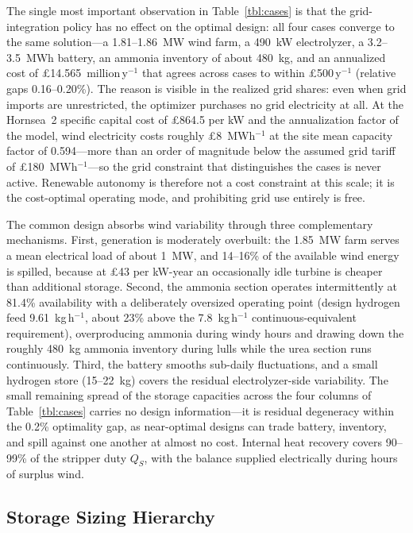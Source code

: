 \documentclass[letterpaper]{article}
\begin{document}
The single most important observation in Table~\ref{tbl:cases} is
that the grid-integration policy has no effect on the optimal
design: all four cases converge to the same solution---a
1.81--1.86~MW wind farm, a 490~kW electrolyzer, a 3.2--3.5~MWh
battery, an ammonia inventory of about 480~kg, and an annualized
cost of \pounds 14.565~million\,y$^{-1}$ that agrees across cases to
within \pounds 500\,y$^{-1}$ (relative gaps 0.16--0.20\%). The
reason is visible in the realized grid shares: even when grid
imports are unrestricted, the optimizer purchases no grid
electricity at all. At the Hornsea~2 specific capital cost of
\pounds 864.5 per kW and the annualization factor of the model, wind
electricity costs roughly \pounds 8~MWh$^{-1}$ at the site mean
capacity factor of 0.594---more than an order of magnitude below the
assumed grid tariff of \pounds 180~MWh$^{-1}$---so the grid
constraint that distinguishes the cases is never active. Renewable
autonomy is therefore not a cost constraint at this scale; it is the
cost-optimal operating mode, and prohibiting grid use entirely is
free.

The common design absorbs wind variability through three
complementary mechanisms. First, generation is moderately overbuilt:
the 1.85~MW farm serves a mean electrical load of about 1~MW, and
14--16\% of the available wind energy is spilled, because at
\pounds 43 per kW-year an occasionally idle turbine is cheaper than
additional storage. Second, the ammonia section operates
intermittently at 81.4\% availability with a deliberately oversized
operating point (design hydrogen feed 9.61~kg\,h$^{-1}$, about 23\%
above the 7.8~kg\,h$^{-1}$ continuous-equivalent requirement),
overproducing ammonia during windy hours and drawing down the
roughly 480~kg ammonia inventory during lulls while the urea section
runs continuously. Third, the battery smooths sub-daily
fluctuations, and a small hydrogen store (15--22~kg) covers the
residual electrolyzer-side variability. The small remaining spread
of the storage capacities across the four columns of
Table~\ref{tbl:cases} carries no design information---it is residual
degeneracy within the 0.2\% optimality gap, as near-optimal designs
can trade battery, inventory, and spill against one another at
almost no cost. Internal heat recovery covers 90--99\% of the
stripper duty $Q_S$, with the balance supplied electrically during
hours of surplus wind.

\subsection{Storage Sizing Hierarchy}
\end{document}
